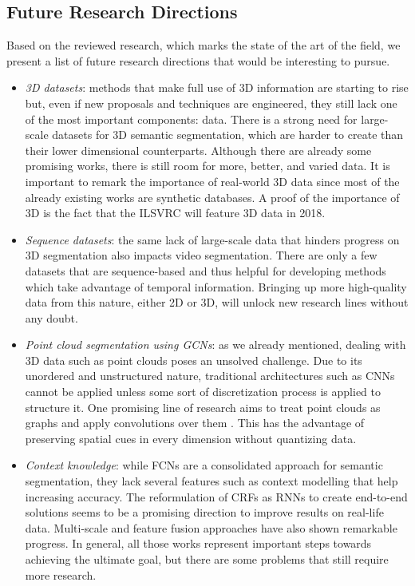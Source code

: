 \subsection{Future Research Directions}

Based on the reviewed research, which marks the state of the art of the field, we present a list of future research directions that would be interesting to pursue.

\begin{itemize}
	\item \emph{3D datasets}: methods that make full use of \acs{3D} information are starting to rise but, even if new proposals and techniques are engineered, they still lack one of the most important components: data. There is a strong need for large-scale datasets for \acs{3D} semantic segmentation, which are harder to create than their lower dimensional counterparts. Although there are already some promising works, there is still room for more, better, and varied data. It is important to remark the importance of real-world 3D data since most of the already existing works are synthetic databases. A proof of the importance of \acs{3D} is the fact that the \acs{ILSVRC} will feature \acs{3D} data in 2018.
	\item \emph{Sequence datasets}: the same lack of large-scale data that hinders progress on \acs{3D} segmentation also impacts video segmentation. There are only a few datasets that are sequence-based and thus helpful for developing methods which take advantage of temporal information. Bringing up more high-quality data from this nature, either \acs{2D} or \acs{3D}, will unlock new research lines without any doubt.
	\item \emph{Point cloud segmentation using \acp{GCN}}: as we already mentioned, dealing with \acs{3D} data such as point clouds poses an unsolved challenge. Due to its unordered and unstructured nature, traditional architectures such as \acp{CNN} cannot be applied unless some sort of discretization process is applied to structure it. One promising line of research aims to treat point clouds as graphs and apply convolutions over them \cite{Henaff2015} \cite{Kipf2016} \cite{Niepert2016}. This has the advantage of preserving spatial cues in every dimension without quantizing data.
	\item \emph{Context knowledge}: while \acp{FCN} are a consolidated approach for semantic segmentation, they lack several features such as context modelling that help increasing accuracy. The reformulation of CRFs as RNNs to create end-to-end solutions seems to be a promising direction to improve results on real-life data. Multi-scale and feature fusion approaches have also shown remarkable progress. In general, all those works represent important steps towards achieving the ultimate goal, but there are some problems that still require more research.

\end{itemize}
